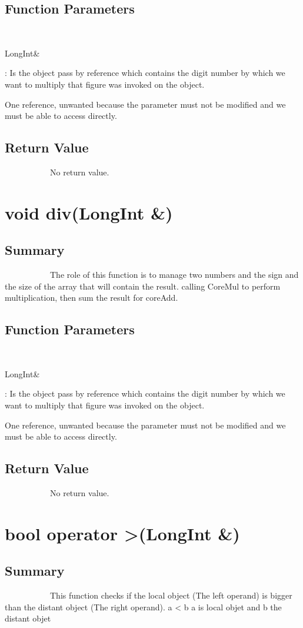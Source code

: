 \documentclass[11pt]{report}
\begin{document}
	\subsection{Function Parameters}
~~~~~~~~~~~\begin{bf}LongInt\&\end{bf}: Is the object pass by reference which contains the digit number by which
we want to multiply that figure was invoked on the object.

One reference, unwanted because the parameter must not be modified and
we must be able to access directly.

\subsection{Return Value}
~~~~~~~~~~~No return value.

\section{void div(LongInt \&)}
	\subsection{Summary}
~~~~~~~~~~~The role of this function is to manage two numbers and
the sign and the size of the array that will contain the result.
calling CoreMul to perform multiplication, then sum the result for coreAdd.
	\subsection{Function Parameters}
~~~~~~~~~~~\begin{bf}LongInt\&\end{bf}: Is the object pass by reference which contains the digit number by which
we want to multiply that figure was invoked on the object.

One reference, unwanted because the parameter must not be modified and
we must be able to access directly.

\subsection{Return Value}
~~~~~~~~~~~No return value.

\section{bool operator \textgreater (LongInt \&)}
	\subsection{Summary}
~~~~~~~~~~~This function checks if the local object (The left operand) is bigger than the distant object (The right operand).
a < b a is local objet and b the distant objet
\end{document}
